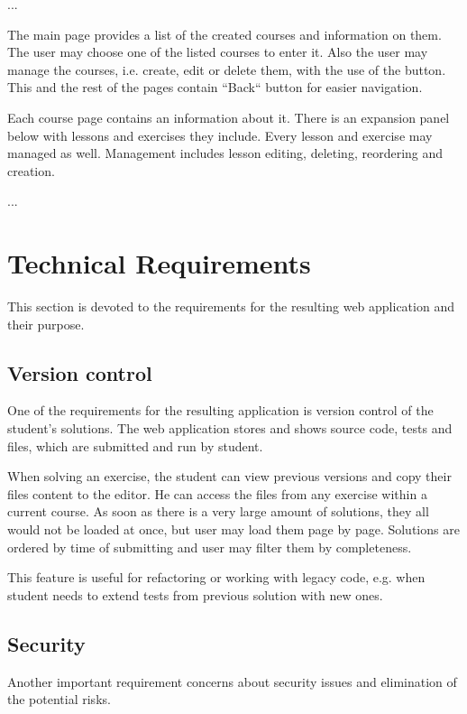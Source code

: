 ...

The main page provides a list of the created courses and information on them. The user may choose one of the listed courses to enter it. Also the user may manage the courses, i.e. create, edit or delete them, with the use of the button. This and the rest of the pages contain ``Back`` button for easier navigation.

Each course page contains an information about it. There is an expansion panel below with lessons and exercises they include. Every lesson and exercise may managed as well. Management includes lesson editing, deleting, reordering and creation.

...

\section{Technical Requirements}
    \label{sec:requirements}
    This section is devoted to the requirements for the resulting web application and their purpose.
        
        \subsection{Version control}
        \label{subsec:version-control}
        One of the requirements for the resulting application is version control of the student's solutions. The web application stores and shows source code, tests and files, which are submitted and run by student.
        
        When solving an exercise, the student can view previous versions and copy their files content to the editor. He can access the files from any exercise within a current course. As soon as there is a very large amount of solutions, they all would not be loaded at once, but user may load them page by page. Solutions are ordered by time of submitting and user may filter them by completeness. 
        
        This feature is useful for refactoring or working with legacy code, e.g. when student needs to extend tests from previous solution with new ones.
        
        \subsection{Security}
        \label{subsec:security}
        Another important requirement concerns about security issues and elimination of the potential risks.
        
